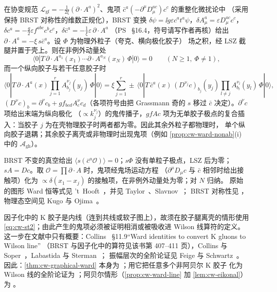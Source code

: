 \begin{theorem}\label{thm:cw-graphical-ward}
在协变规范 $\mathcal L_{\mathrm{gf}}=-\frac{1}{2\xi}(\partial\cdot A^a)^2$、鬼项 $\bar c^a(-\partial^\mu D^{ac}_\mu)c^c$ 的重整化微扰论中
（采用保持 BRST 对称性的维数正规化），BRST 变换
$\delta\psi=\ii g\varepsilon c^at^a\psi$，$\delta A^a_\mu=\varepsilon D^{ac}_\mu c^c$，$\delta c^a=-\frac g2\varepsilon f^{abc}c^bc^c$，$\delta\bar c^a=-\frac{1}{\xi}\varepsilon\,\partial\cdot A^a$
（PS~\cite{PeskinSchroeder1995} \S16.4，符号请写作者再核）给出 $\partial\cdot A^a=-\xi\,s\bar c^a$。设 $\Phi$ 为物理外粒子（夸克、横向极化胶子）
场之积，经 LSZ 截腿并置于壳上。则在非例外动量处 \tagR
\begin{equation}\label{eq:cw-st1}
\langle0|T\,\partial\cdot A^{a_1}(x_1)\cdots\partial\cdot A^{a_N}(x_N)\,\Phi|0\rangle=0\qquad(N\ge1,\ \Phi\ne1),
\end{equation}
而一个纵向胶子与若干任意胶子时
\begin{equation}\label{eq:cw-st2}
\langle0|T\,\partial\cdot A^{a}(x)\prod_{j=1}^rA^{\nu_j}_{b_j}(y_j)\,\Phi|0\rangle
=\xi\sum_{j=1}^r\pm\,\langle0|T\,\bar c^{a}(x)\,(D^{\nu_j}c)_{b_j}(y_j)\prod_{l\neq j}A^{\nu_l}_{b_l}(y_l)\,\Phi|0\rangle ,
\end{equation}
$(D^\nu c)_b=\partial^\nu c_b+gf_{bcd}A^\nu_cc_d$（各项符号由把 Grassmann 奇的 $s$ 移过 $\bar c$ 决定）。$\partial^\nu c$ 项给出末端为纵向极化
（$\propto k_j^{\nu_j}$）的鬼传播子，$gfAc$ 项为无单胶子极点的复合插入：当胶子 $j$ 为在壳物理胶子时两者都为零。因此其余外粒子都物理时，
单个纵向胶子退耦；其余胶子离壳或非物理时出现鬼项（例如 \cref{prop:cw-ward-nonab}(i) 中的 $\mathcal A_{\mathrm{gh}}$）。
\end{theorem}

\begin{proofsketch}
BRST 不变的真空给出 $\langle s(\bar c^a\mathcal O)\rangle=0$；$s\Phi$ 没有单粒子极点，LSZ 后为零；$sA=Dc$。取 $\mathcal O=\prod\partial\cdot A$ 时，鬼项经鬼场运动方程
（$\partial^\mu D_\mu c$ 与 $\bar c$ 相邻时给出接触项）化为 $\propto\delta(x_1-x_j)$ 的接触项，在非例外动量处为零；对 $N$ 归纳。
原始的图形 Ward 恒等式见 't~Hooft~\cite{tHooft1971}，并见 Taylor~\cite{Taylor1971}、Slavnov~\cite{Slavnov1972}；
BRST 对称性见 \cite{BecchiRouetStora1975,BecchiRouetStora1976,Tyutin1975}，物理态空间见 Kugo 与 Ojima~\cite{KugoOjima1979}。
\end{proofsketch}

\begin{remark}[在因子化证明中的用法与严格性]\label{rem:cw-ward-status}
因子化中的 K 胶子是内线（连到共线或软子图上），故须在胶子腿离壳的情形使用 \cref{eq:cw-st2}；由此产生的鬼项必须被证明相消或被吸收进
Wilson 线算符的定义。这一步在文献中只有概要：Collins~\cite{Collins2011} \S11.9“Ward identities to convert K gluons to Wilson line”
（BRST 与因子化中的算符见该书第 407–411 页），Collins 与 Soper~\cite{CollinsSoper1982a}，Labastida 与 Sterman~\cite{LabastidaSterman1985}；
振幅层次的全阶论证见 Feige 与 Schwartz~\cite{FeigeSchwartz2014}。因此：\cref{thm:cw-graphical-ward} 本身为 \tagR；用它把任意多个非阿贝尔 K 胶子
化为 Wilson 线的全阶论证为 \tagA；阿贝尔情形（\cref{prop:cw-ward-line} 加 \cref{lem:cw-eikonal}）为 \tagR。
\end{remark}

